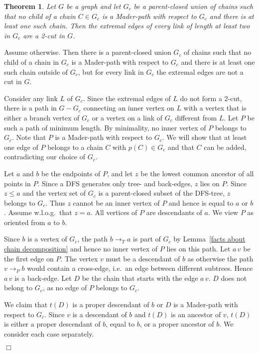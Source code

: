 \documentclass[paper=a4]{scrartcl}
\newtheorem{theorem}{Theorem}
\newcommand{\mqed}{\hfill$\Box$}
\newlength{\proofpostskipamount}\newlength{\proofpreskipamount}
\newenvironment{proof}{\par\vspace{\proofpreskipamount}\noindent{\textbf{Proof:}}\hspace{0.5em}}{\nopagebreak \strut\nopagebreak \hspace{\fill}\mqed\par\vspace{\proofpostskipamount}\noindent}
\newcommand{\edge}[2]{\ensuremath{#1\,#2}}
\begin{document}
\begin{theorem}\label{order exists} Let $G$ be a graph and let $G_c$ be a parent-closed union of chains such that no child of a chain $C \in G_c$ is a Mader-path with respect to $G_c$ and there is at least one such chain. Then the extremal edges of every link of length at least two in $G_c$ are a 2-cut in $G$.
\end{theorem}
\begin{proof} Assume otherwise. Then there is a parent-closed union $G_c$ of
  chains such that no child of a chain in $G_c$ is a Mader-path with respect to $G_c$ and there is at least one such chain outside of $G_c$, but for every link in $G_c$ the extremal edges are not a cut in $G$.

Consider any link $L$ of $G_c$. Since the extremal edges of $L$ do not form a 2-cut, there is a path in $G-G_c$ connecting an inner vertex on $L$ with a vertex that is either a branch vertex of $G_c$ or a vertex on a link of $G_c$ different from $L$. Let $P$ be such a path of minimum length. By minimality, no inner vertex of $P$ belongs to $G_c$. Note that $P$ is a Mader-path with respect to $G_c$. We will show that at least one edge of $P$ belongs to a chain $C$ with $p(C)\in G_c$ and that $C$ can be added, contradicting our choice of $G_c$.

Let $a$ and $b$ be the endpoints of $P$, and let $z$ be the lowest common ancestor of all points in $P$. Since a DFS generates only tree- and back-edges, $z$ lies on $P$. Since $z \le a$ and the vertex set of $G_c$ is a parent-closed subset of the DFS-tree, $z$ belongs to $G_c$. Thus $z$ cannot be an inner vertex of $P$ and hence is 
equal to $a$ or $b$. Assume w.l.o.g.~that $z = a$. All vertices of $P$ are descendants of $a$. We view $P$ as oriented from $a$ to $b$.

Since $b$ is a vertex of $G_c$, the path $b\rightarrow_T a$ is part of $G_c$ by Lemma~\ref{facts about chain decomposition} and hence no inner vertex of $P$ lies on this path. Let $\edge{a}{v}$ be the first edge on $P$. The vertex $v$ must be a descendant of $b$ as otherwise the path $v\rightarrow _P b$ would contain a cross-edge, i.e.\ an edge between different subtrees. Hence $\edge{a}{v}$ is a back-edge. Let $D$ be the chain that starts with the edge $\edge{a}{v}$. $D$ does not belong to $G_c$, as no edge of $P$ belongs to $G_c$.

We claim that $t(D)$ is a proper descendant of $b$ or $D$ is a Mader-path with respect to $G_c$. Since $v$ is a descendant of $b$ and $t(D)$ is an ancestor of $v$, $t(D)$ is either a proper descendant of $b$, equal to $b$, or a proper ancestor of $b$. We consider each case separately.


\end{proof}
\end{document}
